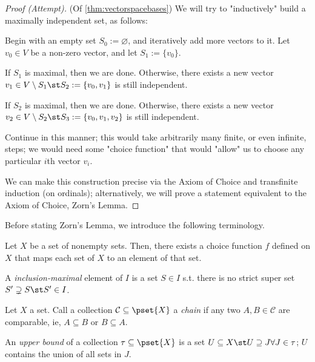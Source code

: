 \begin{proof}[Proof (Attempt)](Of \cref{thm:vectorspacebases})
    We will try to "inductively" build a maximally independent set, as follows:
    
    Begin with an empty set $S_0 := \varnothing$, and iteratively add more vectors to it. Let $v_0 \in V$ be a non-zero vector, and let $S_1 := \{v_0\}$.

    If $S_1$ is maximal, then we are done. Otherwise, there exists a new vector $v_1 \in V \setminus S_1 \st S_2 := \{v_0, v_1\}$ is still independent.

    If $S_2$ is maximal, then we are done. Otherwise, there exists a new vector $v_2 \in V \setminus S_2 \st S_3 := \{v_0, v_1, v_2\}$ is still independent.

    Continue in this manner; this would take arbitrarily many finite, or even infinite, steps; we would need some "choice function" that would "allow" us to choose any particular $i$th vector $v_i$. 
    
    We can make this construction precise via the Axiom of Choice and transfinite induction (on ordinals); alternatively, we will prove a statement equivalent to the Axiom of Choice, Zorn's Lemma.
\end{proof}

\begin{remark}
    Before stating Zorn's Lemma, we introduce the following terminology.
\end{remark}

\begin{axiom}
    Let $X$ be a set of nonempty sets. Then, there exists a choice function $f$ defined on $X$ that maps each set of $X$ to an element of that set.
\end{axiom}

\begin{definition}
    A \emph{inclusion-maximal} element of $I$ is a set $S \in I$ s.t. there is no strict super set $S' \supsetneq S \st S' \in I$. 
\end{definition}

\begin{definition}[Chain]
    Let $X$ a set. Call a collection $\mathcal{C} \subseteq \pset{X}$ a \emph{chain} if any two $A, B \in \mathcal{C}$ are comparable, ie, $A \subseteq B$ or $B \subseteq A$.
\end{definition}

\begin{definition}
    An \emph{upper bound} of a collection $\tau \subseteq \pset{X}$ is a set $U \subseteq X \st U \supseteq J \forall J \in \tau$; $U$ contains the union of all sets in $J$.
\end{definition}

